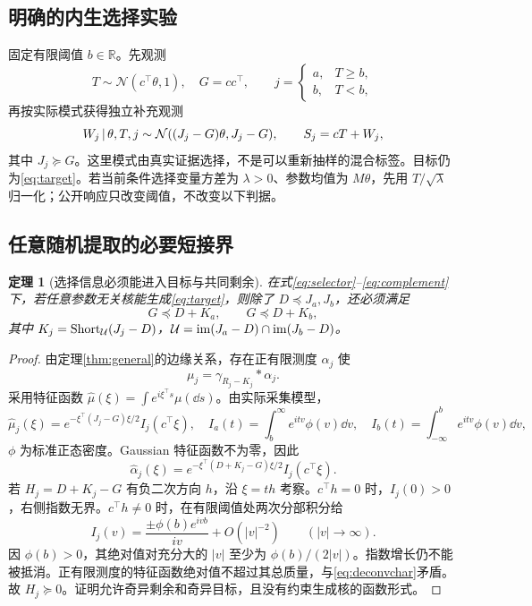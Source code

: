 \documentclass[UTF8,fontset=fandol,11pt,a4paper]{ctexart}
\newcommand{\R}{\mathbb R}\newcommand{\N}{\mathcal N}\newcommand{\E}{\mathbb E}
\newtheorem{theorem}{定理}[section]\newtheorem{lemma}[theorem]{引理}
\theoremstyle{definition}\newtheorem{definition}[theorem]{定义}\newtheorem{assumption}[theorem]{条件}
\numberwithin{equation}{section}
\begin{document}
\subsection{明确的内生选择实验}
固定有限阈值 $b\in\R$。先观测
\begin{equation}
T\sim\N(c^\top\theta,1),\quad G=cc^\top,\qquad
j=\begin{cases}a,&T\ge b,\\b,&T<b,\end{cases}
\label{eq:selector}
\end{equation}
再按实际模式获得独立补充观测
\begin{equation}
W_j\given\theta,T,j\sim\N((J_j-G)\theta,J_j-G),
\qquad S_j=cT+W_j,
\label{eq:complement}
\end{equation}
其中 $J_j\succeq G$。这里模式由真实证据选择，不是可以重新抽样的混合标签。目标仍为\eqref{eq:target}。若当前条件选择变量方差为 $\lambda>0$、参数均值为 $M\theta$，先用 $T/\sqrt\lambda$ 归一化；公开响应只改变阈值，不改变以下判据。

\subsection{任意随机提取的必要短接界}
\begin{theorem}[选择信息必须能进入目标与共同剩余]
\label{thm:necessaryshort}
在式\eqref{eq:selector}--\eqref{eq:complement}下，若任意参数无关核能生成\eqref{eq:target}，则除了 $D\preceq J_a,J_b$，还必须满足
\begin{equation}
\boxed{G\preceq D+K_a,\qquad G\preceq D+K_b,}
\label{eq:necessaryshort}
\end{equation}
其中 $K_j=\operatorname{Short}_{\mathcal U}(J_j-D)$，$\mathcal U=\operatorname{im}(J_a-D)\cap\operatorname{im}(J_b-D)$。
\end{theorem}
\begin{proof}
由定理\ref{thm:general}的边缘关系，存在正有限测度 $\alpha_j$ 使
\[
\mu_j=\gamma_{R_j-K_j}*\alpha_j.
\]
采用特征函数 $\widehat\mu(\xi)=\int e^{i\xi^\top s}\mu(\dd s)$。由实际采集模型，
\begin{equation}
\widehat\mu_j(\xi)
=e^{-\xi^\top(J_j-G)\xi/2}I_j(c^\top\xi),\quad
I_a(t)=\int_b^\infty e^{itv}\phi(v)\dd v,
\quad I_b(t)=\int_{-\infty}^b e^{itv}\phi(v)\dd v,
\end{equation}
$\phi$ 为标准正态密度。Gaussian 特征函数不为零，因此
\begin{equation}
\widehat\alpha_j(\xi)
=e^{-\xi^\top(D+K_j-G)\xi/2}I_j(c^\top\xi).
\label{eq:deconvchar}
\end{equation}
若 $H_j=D+K_j-G$ 有负二次方向 $h$，沿 $\xi=th$ 考察。$c^\top h=0$ 时，$I_j(0)>0$，右侧指数无界。$c^\top h\ne0$ 时，在有限阈值处两次分部积分给
\[
I_j(v)=\frac{\pm\phi(b)e^{ivb}}{iv}+O(|v|^{-2})
\qquad(|v|\to\infty).
\]
因 $\phi(b)>0$，其绝对值对充分大的 $|v|$ 至少为 $\phi(b)/(2|v|)$。指数增长仍不能被抵消。正有限测度的特征函数绝对值不超过其总质量，与\eqref{eq:deconvchar}矛盾。故 $H_j\succeq0$。证明允许奇异剩余和奇异目标，且没有约束生成核的函数形式。
\end{proof}
\end{document}
